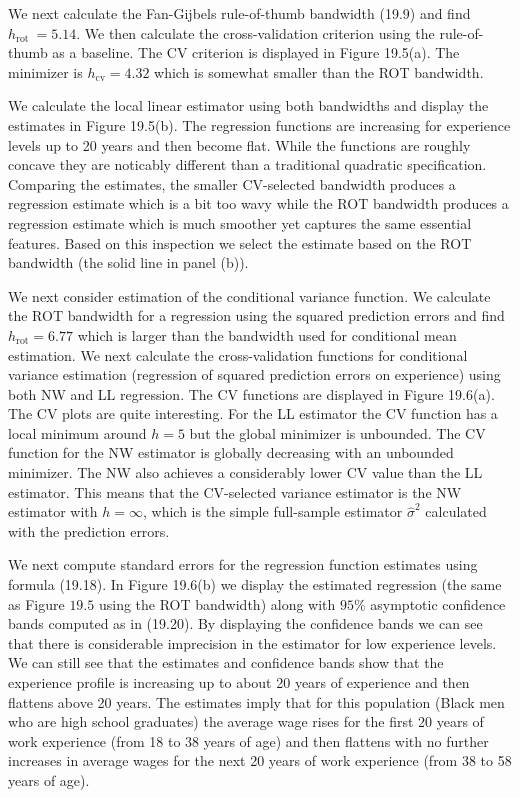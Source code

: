 \documentclass[10pt]{article}
\begin{document}
We next calculate the Fan-Gijbels rule-of-thumb bandwidth (19.9) and find $h_{\text {rot }}=5.14$. We then calculate the cross-validation criterion using the rule-of-thumb as a baseline. The CV criterion is displayed in Figure 19.5(a). The minimizer is $h_{\mathrm{cv}}=4.32$ which is somewhat smaller than the ROT bandwidth.

We calculate the local linear estimator using both bandwidths and display the estimates in Figure 19.5(b). The regression functions are increasing for experience levels up to 20 years and then become flat. While the functions are roughly concave they are noticably different than a traditional quadratic specification. Comparing the estimates, the smaller CV-selected bandwidth produces a regression estimate which is a bit too wavy while the ROT bandwidth produces a regression estimate which is much smoother yet captures the same essential features. Based on this inspection we select the estimate based on the ROT bandwidth (the solid line in panel (b)).

We next consider estimation of the conditional variance function. We calculate the ROT bandwidth for a regression using the squared prediction errors and find $h_{\mathrm{rot}}=6.77$ which is larger than the bandwidth used for conditional mean estimation. We next calculate the cross-validation functions for conditional variance estimation (regression of squared prediction errors on experience) using both NW and LL regression. The CV functions are displayed in Figure 19.6(a). The CV plots are quite interesting. For the LL estimator the CV function has a local minimum around $h=5$ but the global minimizer is unbounded. The CV function for the NW estimator is globally decreasing with an unbounded minimizer. The NW also achieves a considerably lower CV value than the LL estimator. This means that the CV-selected variance estimator is the NW estimator with $h=\infty$, which is the simple full-sample estimator $\widehat{\sigma}^{2}$ calculated with the prediction errors.

We next compute standard errors for the regression function estimates using formula (19.18). In Figure 19.6(b) we display the estimated regression (the same as Figure $19.5$ using the ROT bandwidth) along with $95 \%$ asymptotic confidence bands computed as in (19.20). By displaying the confidence bands we can see that there is considerable imprecision in the estimator for low experience levels. We can still see that the estimates and confidence bands show that the experience profile is increasing up to about 20 years of experience and then flattens above 20 years. The estimates imply that for this population (Black men who are high school graduates) the average wage rises for the first 20 years of work experience (from 18 to 38 years of age) and then flattens with no further increases in average wages for the next 20 years of work experience (from 38 to 58 years of age).
\end{document}
